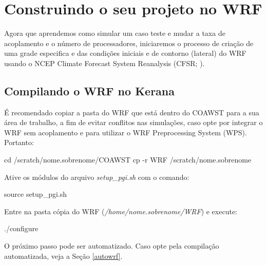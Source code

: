 \chapter{Construindo o seu projeto no WRF}
\bigskip 
\noindent Agora que aprendemos como simular um caso teste e mudar a taxa de acoplamento e o número de processadores, iniciaremos o processo de criação de uma grade especifica e das condições iniciais e de contorno (lateral) do WRF usando o NCEP Climate Forecast System Reanalysis (CFSR; \cite{Saha2006}).
\bigskip

\section{Compilando o WRF no Kerana}
\bigskip
\noindent É recomendado copiar a pasta do WRF que está dentro do COAWST para a sua área de trabalho, a fim de evitar conflitos nas simulações, caso opte por integrar o WRF sem acoplamento e para utilizar o WRF Preprocessing System (WPS). Portanto:
\bigskip

\begin{bashcode}
cd /scratch/nome.sobrenome/COAWST
cp -r WRF /scratch/nome.sobrenome
\end{bashcode}
\bigskip

\noindent Ative os módulos do arquivo \textit{setup\_pgi.sh} com o comando:
\bigskip
\begin{bashcode}
source setup_pgi.sh
\end{bashcode}
\bigskip

\noindent Entre na pasta cópia do WRF (\textit{/home/nome.sobrenome/WRF}) e execute:
\bigskip

\begin{bashcode}
./configure
\end{bashcode}
\bigskip

\begin{tcolorbox}[enhanced,
  grow to left by=0cm,%
  grow to right by=0cm,%
  enlarge top by=0cm,%
  enlarge bottom by=0cm,%
  tcbox raise base,
  boxrule=1.0pt,
  left=18mm,
  colframe=red!50!black,coltext=red!25!black,colback=red!10!white,
  overlay={\begin{tcbclipinterior}\fill[red!75!blue!50!white] (frame.south west)
    rectangle node[text=white,font=\sffamily\bfseries\footnotesize,rotate=0] {ATENÇÃO} ([xshift=18mm]frame.north west);\end{tcbclipinterior}}]
O próximo passo pode ser automatizado. Caso opte pela compilação automatizada, veja a Seção \textcolor{bleu_cite}{\ref{autowrf}}.
\end{tcolorbox}
\bigskip

